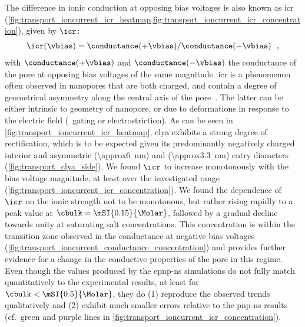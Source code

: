 The difference in ionic conduction at opposing bias voltages is also known as \gls{icr}
(\cref{fig:transport_ioncurrent_icr_heatmap,fig:transport_ioncurrent_icr_concentration}), given by $\icr$:
%
\begin{align}\label{eq:icr}
  \icr(\vbias) = \conductance(+\vbias) / \conductance(-\vbias)
  \text{\,\, ,}
\end{align}
%
with $\conductance(+\vbias)$ and $\conductance(-\vbias)$ the conductance of the pore at opposing bias voltages
of the same magnitude. \gls{icr} is a phenomenon often observed in nanopores that are both charged, and
contain a degree of geometrical asymmetry along the central axis of the
pore~\cite{Constantin-2007,White-2008,Wang-2014}. The latter can be either intrinsic to geometry of nanopore,
or due to deformations in response to the electric field (\ie~gating or electrostriction). As can be seen in
\cref{fig:transport_ioncurrent_icr_heatmap}, \gls{clya} exhibits a strong degree of rectification, which is to
be expected given its predominantly negatively charged interior and asymmetric \cisi{} (\SI{\approx6}{\nm})
and \transi{} (\SI{\approx3.3}{\nm}) entry diameters (\cref{fig:transport_clya_side}). We found $\icr$ to
increase monotonously with the bias voltage magnitude, at least over the investigated range
(\cref{fig:transport_ioncurrent_icr_concentration}). We found the dependence of $\icr$ on the ionic strength
not to be monotonous, but rather rising rapidly to a peak value at $\cbulk=\mSI{0.15}{\Molar}$, followed by a
gradual decline towards unity at saturating salt concentrations. This concentration is within the transition
zone observed in the conductance at negative bias voltages
(\cref{fig:transport_ioncurrent_conductance_concentration}) and provides further evidence for a change in the
conductive properties of the pore in this regime. Even though the values produced by the \gls{epnp-ns}
simulations do not fully match quantitatively to the experimental results, at least for $\cbulk <
\text{\mSI{0.5}{\Molar}}$, they do (1) reproduce the observed trends qualitatively and (2) exhibit much
smaller errors relative to the \gls{pnp-ns} results (cf.~green and purple lines in
\cref{fig:transport_ioncurrent_icr_concentration}).


